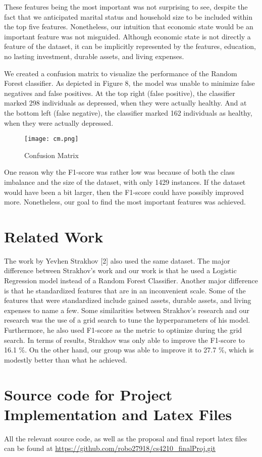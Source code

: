 \documentclass[conference]{IEEEtran}
\begin{document}
These features being the most important was not surprising to see, despite the fact that we anticipated marital status and household size to be included within the top five features. Nonetheless, our intuition that economic state would be an important feature was not misguided. Although economic state is not directly a feature of the dataset, it can be implicitly represented by the features, education, no lasting investment, durable assets, and living expenses.


We created a confusion matrix to visualize the performance of the Random Forest classifier. As depicted in Figure 8, the model was unable to minimize false negatives and false positives. At the top right (false positive), the classifier marked 298 individuals as depressed, when they were actually healthy. And at the bottom left (false negative), the classifier marked 162 individuals as healthy, when they were actually depressed.
\begin{figure}[hbt!]
\centering
\texttt{[image: cm.png]}
\caption{Confusion Matrix\label{overflow}}
\end{figure}

One reason why the F1-score was rather low was because of both the class imbalance and the size of the dataset, with only 1429 instances. If the dataset would have been a bit larger, then the F1-score could have possibly improved more. Nonetheless, our goal to find the most important features was achieved.


\section{Related Work}
The work  by Yevhen Strakhov [2] also used the same dataset. The major difference between Strakhov's work and our work is that he used a Logistic Regression model instead of a Random Forest Classifier. Another major difference is that he standardized features that are in an inconvenient scale. Some of the features that were standardized include gained assets, durable assets, and living expenses to name a few. Some similarities between Strakhov's research and our research was the use of a grid search to tune the hyperparameters of his model. Furthermore, he also used F1-score as the metric to optimize during the grid search. In terms of results, Strakhov was only able to improve the F1-score to 16.1 \%. On the other hand, our group was able to improve it to 27.7 \%, which is modestly better than what he achieved.

\section{Source code for Project Implementation and Latex Files}
All the relevant source code, as well as the proposal and final report latex files can be found at \url {https://github.com/robo27918/cs4210_finalProj.git}
\end{document}
